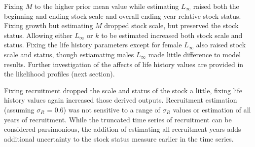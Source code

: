 \documentclass[11pt,
  english,
  a4paper,
]{article}
\begin{document}
\leavevmode\tagmcend\tagstructend\par


Fixing {\(M\)\leavevmode\tagmcend\tagstructend} to the higher prior mean value while estimating {\(L_{\infty}\)\leavevmode\tagmcend\tagstructend} raised both the beginning and ending stock scale and overall ending year relative stock status. Fixing growth but estimating {\(M\)\leavevmode\tagmcend\tagstructend} dropped stock scale, but preserved the stock status. Allowing either {\(L_{\infty}\)\leavevmode\tagmcend\tagstructend} or {\(k\)\leavevmode\tagmcend\tagstructend} to be estimated increased both stock scale and status. Fixing the life history parameters except for female {\(L_{\infty}\)\leavevmode\tagmcend\tagstructend} also raised stock scale and status, though estiamating males {\(L_{\infty}\)\leavevmode\tagmcend\tagstructend} made little difference to model results. Further investigation of the affects of life history values are provided in the likelihood profiles (next section).

\leavevmode\tagmcend\tagstructend\par


Fixing recruitment dropped the scale and status of the stock a little, fixing life history values again increased those derived outputs. Recruitment estimation (assuming {\(\sigma_R\)\leavevmode\tagmcend\tagstructend} = 0.6) was not sensitive to a range of {\(\sigma_R\)\leavevmode\tagmcend\tagstructend} values or estimation of all years of recruitment. While the truncated time series of recruitment can be considered parsimonious, the addition of estimating all recruitment years adds additional uncertainty to the stock status measure earlier in the time series.

\leavevmode\tagmcend\tagstructend\par

\end{document}
